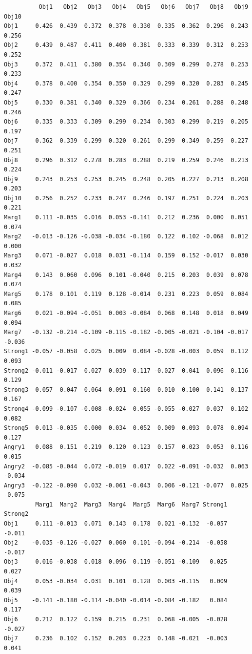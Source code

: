 \documentclass[
  english,
]{book}
\begin{document}
\begin{verbatim}
          Obj1   Obj2   Obj3   Obj4   Obj5   Obj6   Obj7   Obj8   Obj9  Obj10
Obj1     0.426  0.439  0.372  0.378  0.330  0.335  0.362  0.296  0.243  0.256
Obj2     0.439  0.487  0.411  0.400  0.381  0.333  0.339  0.312  0.253  0.252
Obj3     0.372  0.411  0.380  0.354  0.340  0.309  0.299  0.278  0.253  0.233
Obj4     0.378  0.400  0.354  0.350  0.329  0.299  0.320  0.283  0.245  0.247
Obj5     0.330  0.381  0.340  0.329  0.366  0.234  0.261  0.288  0.248  0.246
Obj6     0.335  0.333  0.309  0.299  0.234  0.303  0.299  0.219  0.205  0.197
Obj7     0.362  0.339  0.299  0.320  0.261  0.299  0.349  0.259  0.227  0.251
Obj8     0.296  0.312  0.278  0.283  0.288  0.219  0.259  0.246  0.213  0.224
Obj9     0.243  0.253  0.253  0.245  0.248  0.205  0.227  0.213  0.208  0.203
Obj10    0.256  0.252  0.233  0.247  0.246  0.197  0.251  0.224  0.203  0.221
Marg1    0.111 -0.035  0.016  0.053 -0.141  0.212  0.236  0.000  0.051  0.074
Marg2   -0.013 -0.126 -0.038 -0.034 -0.180  0.122  0.102 -0.068  0.012  0.000
Marg3    0.071 -0.027  0.018  0.031 -0.114  0.159  0.152 -0.017  0.030  0.032
Marg4    0.143  0.060  0.096  0.101 -0.040  0.215  0.203  0.039  0.078  0.074
Marg5    0.178  0.101  0.119  0.128 -0.014  0.231  0.223  0.059  0.084  0.085
Marg6    0.021 -0.094 -0.051  0.003 -0.084  0.068  0.148  0.018  0.049  0.094
Marg7   -0.132 -0.214 -0.109 -0.115 -0.182 -0.005 -0.021 -0.104 -0.017 -0.036
Strong1 -0.057 -0.058  0.025  0.009  0.084 -0.028 -0.003  0.059  0.112  0.093
Strong2 -0.011 -0.017  0.027  0.039  0.117 -0.027  0.041  0.096  0.116  0.129
Strong3  0.057  0.047  0.064  0.091  0.160  0.010  0.100  0.141  0.137  0.167
Strong4 -0.099 -0.107 -0.008 -0.024  0.055 -0.055 -0.027  0.037  0.102  0.082
Strong5  0.013 -0.035  0.000  0.034  0.052  0.009  0.093  0.078  0.094  0.127
Angry1   0.088  0.151  0.219  0.120  0.123  0.157  0.023  0.053  0.116  0.015
Angry2  -0.085 -0.044  0.072 -0.019  0.017  0.022 -0.091 -0.032  0.063 -0.034
Angry3  -0.122 -0.090  0.032 -0.061 -0.043  0.006 -0.121 -0.077  0.025 -0.075
         Marg1  Marg2  Marg3  Marg4  Marg5  Marg6  Marg7 Strong1 Strong2
Obj1     0.111 -0.013  0.071  0.143  0.178  0.021 -0.132  -0.057  -0.011
Obj2    -0.035 -0.126 -0.027  0.060  0.101 -0.094 -0.214  -0.058  -0.017
Obj3     0.016 -0.038  0.018  0.096  0.119 -0.051 -0.109   0.025   0.027
Obj4     0.053 -0.034  0.031  0.101  0.128  0.003 -0.115   0.009   0.039
Obj5    -0.141 -0.180 -0.114 -0.040 -0.014 -0.084 -0.182   0.084   0.117
Obj6     0.212  0.122  0.159  0.215  0.231  0.068 -0.005  -0.028  -0.027
Obj7     0.236  0.102  0.152  0.203  0.223  0.148 -0.021  -0.003   0.041

\end{verbatim}
\end{document}
